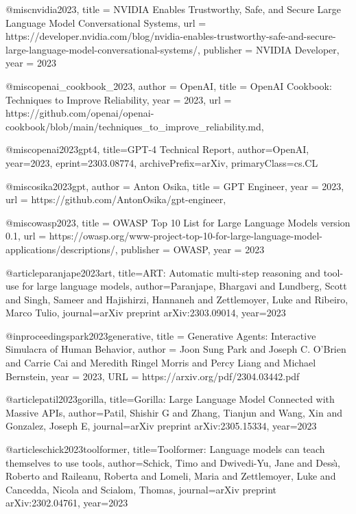 @misc{nvidia2023,
  title = {NVIDIA Enables Trustworthy, Safe, and Secure Large Language Model Conversational Systems},
  url = {https://developer.nvidia.com/blog/nvidia-enables-trustworthy-safe-and-secure-large-language-model-conversational-systems/},
  publisher = {NVIDIA Developer},
  year = {2023}
}

@misc{openai_cookbook_2023,
  author = {OpenAI},
  title = {OpenAI Cookbook: Techniques to Improve Reliability},
  year = {2023},
  url = {https://github.com/openai/openai-cookbook/blob/main/techniques_to_improve_reliability.md},
}

@misc{openai2023gpt4,
      title={GPT-4 Technical Report},
      author={OpenAI},
      year={2023},
      eprint={2303.08774},
      archivePrefix={arXiv},
      primaryClass={cs.CL}
}

@misc{osika2023gpt,
  author = {Anton Osika},
  title = {GPT Engineer},
  year = {2023},
  url = {https://github.com/AntonOsika/gpt-engineer},
}

@misc{owasp2023,
  title = {OWASP Top 10 List for Large Language Models version 0.1},
  url = {https://owasp.org/www-project-top-10-for-large-language-model-applications/descriptions/},
  publisher = {OWASP},
  year = {2023}
}

@article{paranjape2023art,
  title={ART: Automatic multi-step reasoning and tool-use for large language models},
  author={Paranjape, Bhargavi and Lundberg, Scott and Singh, Sameer and Hajishirzi, Hannaneh and Zettlemoyer, Luke and Ribeiro, Marco Tulio},
  journal={arXiv preprint arXiv:2303.09014},
  year={2023}
}

@inproceedings{park2023generative,
title	= {Generative Agents: Interactive Simulacra of Human Behavior},
author	= {Joon Sung Park and Joseph C. O'Brien and Carrie Cai and Meredith Ringel Morris and Percy Liang and Michael Bernstein},
year	= {2023},
URL	= {https://arxiv.org/pdf/2304.03442.pdf}
}

@article{patil2023gorilla,
  title={Gorilla: Large Language Model Connected with Massive APIs},
  author={Patil, Shishir G and Zhang, Tianjun and Wang, Xin and Gonzalez, Joseph E},
  journal={arXiv preprint arXiv:2305.15334},
  year={2023}
}

@article{schick2023toolformer,
  title={Toolformer: Language models can teach themselves to use tools},
  author={Schick, Timo and Dwivedi-Yu, Jane and Dess{\`\i}, Roberto and Raileanu, Roberta and Lomeli, Maria and Zettlemoyer, Luke and Cancedda, Nicola and Scialom, Thomas},
  journal={arXiv preprint arXiv:2302.04761},
  year={2023}
}

